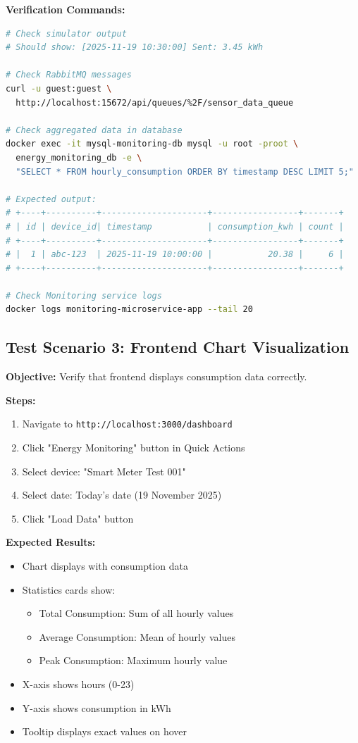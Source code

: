 \documentclass[12pt,a4paper]{article}
\begin{document}
\textbf{Verification Commands:}
\begin{lstlisting}[language=bash]
# Check simulator output
# Should show: [2025-11-19 10:30:00] Sent: 3.45 kWh

# Check RabbitMQ messages
curl -u guest:guest \
  http://localhost:15672/api/queues/%2F/sensor_data_queue

# Check aggregated data in database
docker exec -it mysql-monitoring-db mysql -u root -proot \
  energy_monitoring_db -e \
  "SELECT * FROM hourly_consumption ORDER BY timestamp DESC LIMIT 5;"

# Expected output:
# +----+----------+---------------------+-----------------+-------+
# | id | device_id| timestamp           | consumption_kwh | count |
# +----+----------+---------------------+-----------------+-------+
# |  1 | abc-123  | 2025-11-19 10:00:00 |           20.38 |     6 |
# +----+----------+---------------------+-----------------+-------+

# Check Monitoring service logs
docker logs monitoring-microservice-app --tail 20
\end{lstlisting}

\subsection{Test Scenario 3: Frontend Chart Visualization}

\textbf{Objective:} Verify that frontend displays consumption data correctly.

\textbf{Steps:}
\begin{enumerate}
    \item Navigate to \texttt{http://localhost:3000/dashboard}
    \item Click "Energy Monitoring" button in Quick Actions
    \item Select device: "Smart Meter Test 001"
    \item Select date: Today's date (19 November 2025)
    \item Click "Load Data" button
\end{enumerate}

\textbf{Expected Results:}
\begin{itemize}
    \item Chart displays with consumption data
    \item Statistics cards show:
    \begin{itemize}
        \item Total Consumption: Sum of all hourly values
        \item Average Consumption: Mean of hourly values
        \item Peak Consumption: Maximum hourly value
    \end{itemize}
    \item X-axis shows hours (0-23)
    \item Y-axis shows consumption in kWh
    \item Tooltip displays exact values on hover
\end{itemize}
\end{document}
